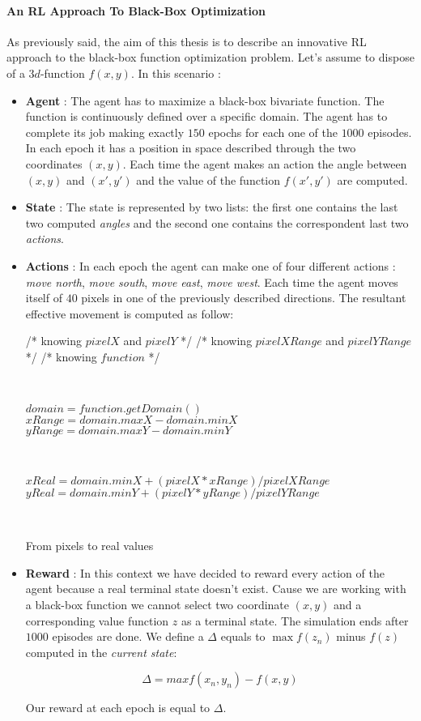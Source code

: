 \paragraph{An RL Approach To Black-Box Optimization} As previously said, the aim of this thesis is to describe an innovative RL approach to the black-box function optimization problem. Let's assume to dispose of a $3d$-function $f(x, y)$. In this scenario :

\begin{itemize}
	\item \textbf{Agent} : The agent has to maximize a black-box bivariate function. The function is continuously defined over a specific domain. The agent has to complete its job making exactly $150$ epochs for each one of the $1000$ episodes. In each epoch it has a position in space described through the two coordinates $(x, y)$. Each time the agent makes an action the angle between $(x, y)$ and $(x', y')$ and the value of the function $f(x', y')$ are computed.
	\item \textbf{State} : The state is represented by two lists: the first one contains the last two computed \textit{angles} and the second one contains the correspondent last two \textit{actions}.
	\item \textbf{Actions} : In each epoch the agent can make one of four different actions : \textit{move north}, \textit{move  south}, \textit{move east}, \textit{move west}. Each time the agent moves itself of $40$ pixels in one of the previously described directions. The resultant effective movement is computed as follow:
	
	\begin{algorithm} [h!]
		/* knowing $pixelX$ and $pixelY$ */\;
		/* knowing $pixelXRange$ and $pixelYRange$ */ \;
		/* knowing $function$ */\;
		
		\
		
		$domain = function.getDomain()$ \;
		$xRange = domain.maxX - domain.minX$ \;
		$yRange = domain.maxY - domain.minY$ \;
		
		\
		
		$xReal = domain.minX + (pixelX * xRange) / pixelXRange$ \;
		$yReal = domain.minY + (pixelY * yRange) / pixelYRange$ \;
		
		\
		
		\caption{From pixels to real values} 
	\end{algorithm}
	
	\item \textbf{Reward} : In this context we have decided to reward every action of the agent because a real terminal state doesn't exist. Cause we are working with a black-box function we cannot select two coordinate $(x, y)$ and a corresponding value function $z$ as a terminal state. The simulation ends after $1000$ episodes are done. We define a $\Delta$ equals to $\max f(z_n)$ minus $f(z)$ computed in the \textit{current state}:
	
	\begin{equation}
		\Delta = max f(x_n, y_n) - f(x, y)
	\end{equation} 
	
	Our reward at each epoch is equal to $\Delta$.
\end{itemize}


